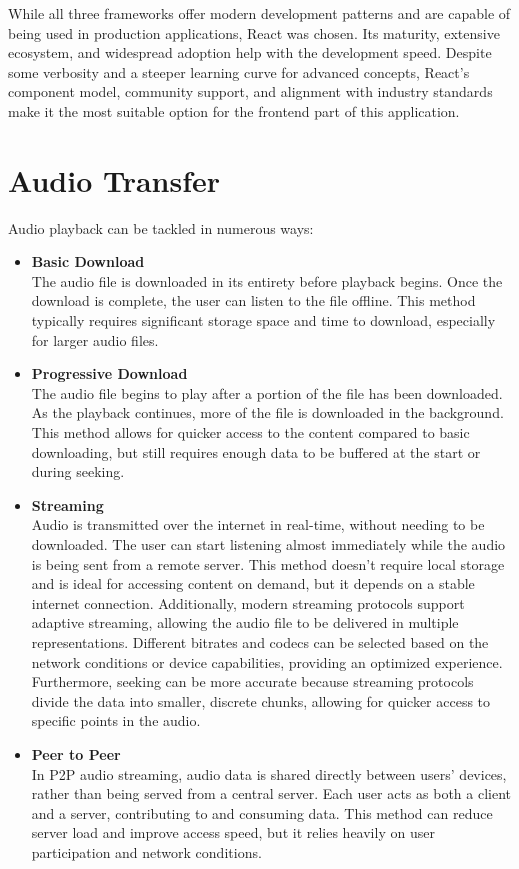 While all three frameworks offer modern development patterns and are capable of being used in production applications,
React was chosen.
Its maturity, extensive ecosystem, and widespread adoption help with the development speed.
Despite some verbosity and a steeper learning curve for advanced concepts,
React’s component model, community support,
and alignment with industry standards make it the most suitable option for the frontend part of this application.


\section{Audio Transfer}
Audio playback can be tackled in numerous ways:

\begin{itemize}
    \item \textbf{Basic Download}\\
    The audio file is downloaded in its entirety before playback begins.
    Once the download is complete, the user can listen to the file offline.
    This method typically requires significant storage space and time to download,
    especially for larger audio files.

    \item \textbf{Progressive Download}\\
    The audio file begins to play after a portion of the file
    has been downloaded. As the playback continues, more of the file is downloaded
    in the background. This method allows for quicker access to the content
    compared to basic downloading, but still requires enough data to be buffered at the start or during seeking.

    \item \textbf{Streaming}\\
    Audio is transmitted over the internet in real-time, without needing
    to be downloaded. The user can start listening almost immediately while the audio is being
    sent from a remote server. This method doesn’t require local storage and is
    ideal for accessing content on demand, but it depends on a stable internet connection.
    Additionally, modern streaming protocols support adaptive streaming, allowing the audio file
    to be delivered in multiple representations. Different bitrates and codecs can be
    selected based on the network conditions or device capabilities, providing an optimized experience.
    Furthermore, seeking can be more accurate because streaming protocols divide the data into
    smaller, discrete chunks, allowing for quicker access to specific points in the audio.

    \item \textbf{Peer to Peer}\\
    In P2P audio streaming, audio data is shared directly between users'
    devices, rather than being served from a central server.
    Each user acts as both a client and a server, contributing to and consuming
    data. This method can reduce server load and improve access speed,
    but it relies heavily on user participation and network conditions.
\end{itemize}

